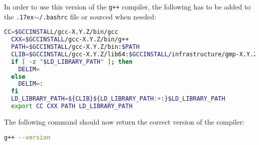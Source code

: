 \documentclass[12pt,a4paper]{report}
\newcommand{\mytilde}{\raise.17ex\hbox{$\scriptstyle\mathtt{\sim}$}}		%
\begin{document}
In order to use this version of the \texttt{g++} compiler, the following has to be added to the \texttt{\mytilde/.bashrc} file or sourced when needed:
\begin{lstlisting}[language=bash]
  CC=$GCCINSTALL/gcc-X.Y.Z/bin/gcc
  CXX=$GCCINSTALL/gcc-X.Y.Z/bin/g++
  PATH=$GCCINSTALL/gcc-X.Y.Z/bin:$PATH
  CLIB=$GCCINSTALL/gcc-X.Y.Z/lib64:$GCCINSTALL/infrastructure/gmp-X.Y.Z/lib:$GCCINSTALL/infrastructure/mpfr-X.Y.Z/lib:$GCCINSTALL/infrastructure/mpc-X.Y.Z/lib
  if [ -z "$LD_LIBRARY_PATH" ]; then
    DELIM=
  else
    DELIM=:
  fi
  LD_LIBRARY_PATH=${CLIB}${LD_LIBRARY_PATH:+:}$LD_LIBRARY_PATH
  export CC CXX PATH LD_LIBRARY_PATH
\end{lstlisting}
The following command should now return the correct version of the compiler:
\begin{lstlisting}[language=bash]
  g++ --version
\end{lstlisting}
\end{document}
